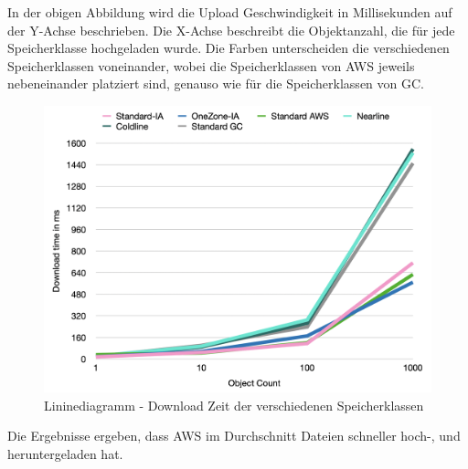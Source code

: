 In der obigen Abbildung wird die Upload Geschwindigkeit in Millisekunden auf der Y-Achse beschrieben. Die X-Achse beschreibt die Objektanzahl, die für jede Speicherklasse hochgeladen wurde. Die Farben unterscheiden die verschiedenen Speicherklassen voneinander, wobei die Speicherklassen von AWS jeweils nebeneinander platziert sind, genauso wie für die Speicherklassen von GC.

\begin{figure}[h]
	\centering
	\includegraphics[width=13cm,keepaspectratio]{Pictures/DownloadTime.png}
	\caption{Lininediagramm - Download Zeit der verschiedenen Speicherklassen}
\end{figure}

Die Ergebnisse ergeben, dass AWS im Durchschnitt Dateien schneller hoch-, und heruntergeladen hat. 